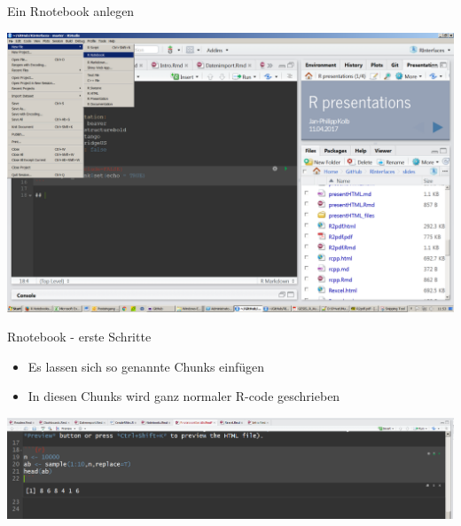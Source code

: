 \documentclass[ignorenonframetext,]{beamer}
\providecommand{\tightlist}{%
\setlength{\itemsep}{0pt}\setlength{\parskip}{0pt}}
\begin{document}
\begin{frame}{Ein Rnotebook anlegen}

\includegraphics{./tex2pdf.956/d34154692b30ba477e047d6d21521a664633debc.png}

\end{frame}

\begin{frame}{Rnotebook - erste Schritte}

\begin{itemize}
\tightlist
\item
  Es lassen sich so genannte Chunks einfügen
\item
  In diesen Chunks wird ganz normaler R-code geschrieben
\end{itemize}

\includegraphics{./tex2pdf.956/973493b0437dbf133e9907d00ce10ce2f82855fb.png}

\end{frame}
\end{document}

